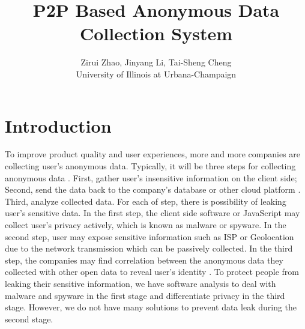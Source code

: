 \documentclass[twocolumn]{article}
\begin{document}
\title{P2P Based Anonymous Data Collection System}
\author{Zirui Zhao, Jinyang Li, Tai-Sheng Cheng \\ \small University of Illinois at Urbana-Champaign}
\date{}
\maketitle
\section{Introduction}

To improve product quality and user experiences, more and more companies are collecting user's anonymous data. Typically, it will be three steps for collecting anonymous data \cite{papadimitriou2016big}. First, gather user's insensitive information on the client side; Second, send the data back to the company's database or other cloud platform \cite{papadimitriou2016big}. Third, analyze collected data. For each of  step, there is possibility of leaking user's sensitive data. In the first step, the client side software or JavaScript may collect user's privacy actively, which is known as malware or spyware. In the second step, user may expose sensitive information such as ISP or Geolocation due to the network transmission which can be passively collected. In the third step, the companies may find correlation between the anonymous data they collected with other open data to reveal user's identity \cite{bittau2017prochlo}. To protect people from leaking their sensitive information, we have software analysis to deal with malware and spyware in the first stage \cite{herley2015spyware} and differentiate privacy \cite{bittau2017prochlo} in the third stage. However, we do not have many solutions to prevent data leak during the second stage.
\end{document}
